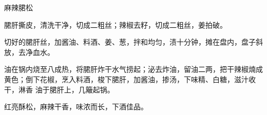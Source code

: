 %
%
%
%
%
%
%
\begin{recipe}{麻辣𬂁松}

\ingredients


\preparation

\step 𬂁肝撕皮，清洗干净，切成二粗丝；辣椒去籽，切成二粗丝，姜拍破。

\step 切好的𬂁肝丝，加酱油、料酒、姜、葱，拌和均匀，渍十分钟，摊在盘内，盘子斜
放，去净血水。

\step 油在锅内烧至八成热，将𬂁肝炸干水气捞起；泌去炸油，留油二两，把干辣椒煵成
黄色；倒下花椒，烹入料酒，梭下𬂁肝，加酱油，掺汤，下味精、白糖，滋汁收干，淋香
油于𬂁肝上，几簸起锅。

\features

红亮酥松，麻辣干香，味浓而长，下酒佳品。

\end{recipe}

